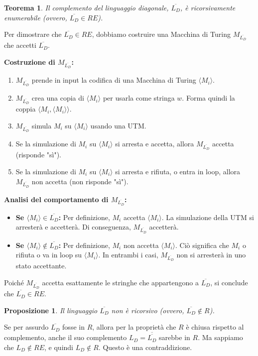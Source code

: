 \documentclass[a4paper]{article}
\makeatletter
\newtheorem{theorem}{Teorema}[section] %
\newtheorem{proposition}{Proposizione}[section]
\renewenvironment{proof}[1][\proofname]{\par
  \pushQED{\qed}%
  \normalfont \topsep6\p@\@plus6\p@\relax
  \trivlist
  \item[\hskip\labelsep
        \bfseries
    #1\@addpunct{.}]\ignorespaces
}{%
  \popQED\endtrivlist\@endpefalse
}
\makeatother
\begin{document}
\begin{theorem}
Il complemento del linguaggio diagonale, $\overline{L_D}$, è ricorsivamente enumerabile (ovvero, $\overline{L_D} \in RE$).
\end{theorem}
\begin{proof}
Per dimostrare che $\overline{L_D} \in RE$, dobbiamo costruire una Macchina di Turing $M_{\overline{L_D}}$ che accetti $\overline{L_D}$.

\textbf{Costruzione di $M_{\overline{L_D}}$:}
\begin{enumerate}
    \item $M_{\overline{L_D}}$ prende in input la codifica di una Macchina di Turing $\langle M_i \rangle$.
    \item $M_{\overline{L_D}}$ crea una copia di $\langle M_i \rangle$ per usarla come stringa $w$. Forma quindi la coppia $\langle M_i, \langle M_i \rangle \rangle$.
    \item $M_{\overline{L_D}}$ simula $M_i$ su $\langle M_i \rangle$ usando una UTM.
    \item Se la simulazione di $M_i$ su $\langle M_i \rangle$ si arresta e accetta, allora $M_{\overline{L_D}}$ accetta (risponde "sì").
    \item Se la simulazione di $M_i$ su $\langle M_i \rangle$ si arresta e rifiuta, o entra in loop, allora $M_{\overline{L_D}}$ non accetta (non risponde "sì").
\end{enumerate}
\textbf{Analisi del comportamento di $M_{\overline{L_D}}$:}
\begin{itemize}
    \item \textbf{Se $\langle M_i \rangle \in \overline{L_D}$:}
    Per definizione, $M_i$ accetta $\langle M_i \rangle$. La simulazione della UTM si arresterà e accetterà. Di conseguenza, $M_{\overline{L_D}}$ accetterà.
    \item \textbf{Se $\langle M_i \rangle \notin \overline{L_D}$:}
    Per definizione, $M_i$ non accetta $\langle M_i \rangle$. Ciò significa che $M_i$ o rifiuta o va in loop su $\langle M_i \rangle$. In entrambi i casi, $M_{\overline{L_D}}$ non si arresterà in uno stato accettante.
\end{itemize}
Poiché $M_{\overline{L_D}}$ accetta esattamente le stringhe che appartengono a $\overline{L_D}$, si conclude che $\overline{L_D} \in RE$.
\end{proof}

\begin{proposition}
Il linguaggio $\overline{L_D}$ non è ricorsivo (ovvero, $\overline{L_D} \notin R$).
\end{proposition}
\begin{proof}
Se per assurdo $\overline{L_D}$ fosse in $R$, allora per la proprietà che $R$ è chiusa rispetto al complemento, anche il suo complemento $L_D = \overline{\overline{L_D}}$ sarebbe in $R$. Ma sappiamo che $L_D \notin RE$, e quindi $L_D \notin R$. Questo è una contraddizione.
\end{proof}
\end{document}
